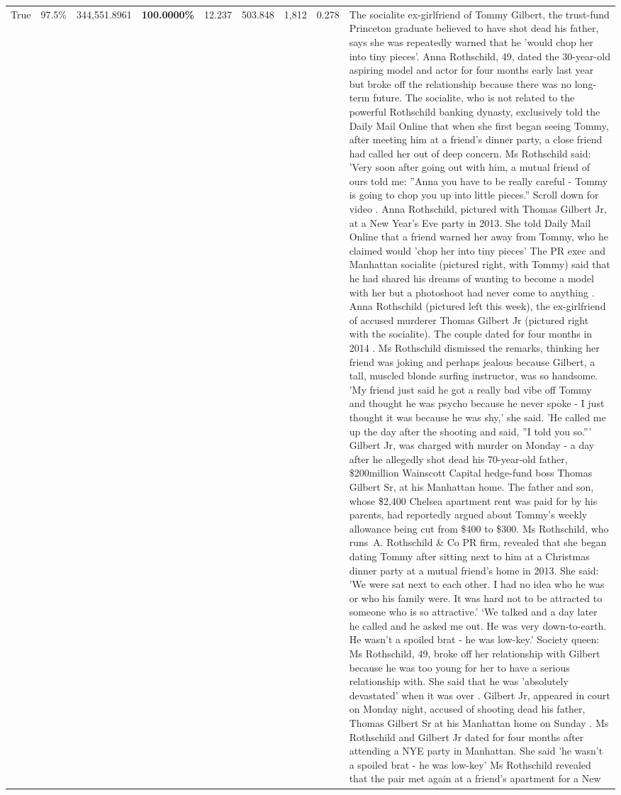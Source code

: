 \begin{table}[H]
\begin{tabular}{lllrlllll}
True & 97.5\% & 344,551.8961 & \bfseries \color{red} 100.0000\% & 12.237 & 503.848 & 1,812 & 0.278 & The socialite ex-girlfriend of Tommy Gilbert, the trust-fund Princeton graduate believed to have shot dead his father, says she was repeatedly warned that he 'would chop her into tiny pieces'. Anna Rothschild, 49, dated the 30-year-old aspiring model and actor for four months early last year but broke off the relationship because there was no long-term future. The socialite, who is not related to the powerful Rothschild banking dynasty, exclusively told the Daily Mail Online that when she first began seeing Tommy, after meeting him at a friend's dinner party, a close friend had called her out of deep concern. Ms Rothschild said: 'Very soon after going out with him, a mutual friend of ours told me: ''Anna you have to be really careful - Tommy is going to chop you up into little pieces.'' Scroll down for video . Anna Rothschild, pictured with Thomas Gilbert Jr, at a New Year's Eve party in 2013. She told Daily Mail Online that a friend warned her away from Tommy, who he claimed would 'chop her into tiny pieces' The PR exec and Manhattan socialite (pictured right, with Tommy) said that he had shared his dreams of wanting to become a model with her but a photoshoot had never come to anything . Anna Rothschild (pictured left this week), the ex-girlfriend of accused murderer Thomas Gilbert Jr (pictured right with the socialite). The couple dated for four months in 2014 . Ms Rothschild dismissed the remarks, thinking her friend was joking and perhaps jealous because Gilbert, a tall, muscled blonde surfing instructor, was so handsome. 'My friend just said he got a really bad vibe off Tommy and thought he was psycho because he never spoke - I just thought it was because he was shy,' she said. 'He called me up the day after the shooting and said, ''I told you so.''' Gilbert Jr, was charged with murder on Monday - a day after he allegedly shot dead his 70-year-old father, \$200million Wainscott Capital hedge-fund boss Thomas Gilbert Sr, at his Manhattan home. The father and son, whose \$2,400 Chelsea apartment rent was paid for by his parents, had reportedly argued about Tommy's weekly allowance being cut from \$400 to \$300. Ms Rothschild, who runs A. Rothschild \& Co PR firm, revealed that she began dating Tommy after sitting next to him at a Christmas dinner party at a mutual friend's home in 2013. She said: 'We were sat next to each other. I had no idea who he was or who his family were. It was hard not to be attracted to someone who is so attractive.' ‘We talked and a day later he called and he asked me out. He was very down-to-earth. He wasn’t a spoiled brat - he was low-key.’ Society queen: Ms Rothschild, 49, broke off her relationship with Gilbert because he was too young for her to have a serious relationship with. She said that he was 'absolutely devastated' when it was over . Gilbert Jr, appeared in court on Monday night, accused of shooting dead his father, Thomas Gilbert Sr at his Manhattan home on Sunday . Ms Rothschild and Gilbert Jr dated for four months after attending a NYE party in Manhattan. She said 'he wasn't a spoiled brat - he was low-key' Ms Rothschild revealed that the pair met again at a friend’s apartment for a New 
\end{tabular}
\end{table}
